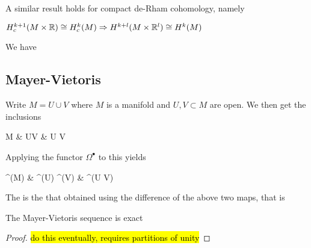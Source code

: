 \documentclass{article}
\begin{document}
A similar result holds for compact de-Rham cohomology, namely

\begin{lemma}
	$H^{k+1}_c(M \times \mathbb{R}) \cong H^k_c(M) \Rightarrow H^{k+l}(M \times \mathbb{R}^l) \cong H^k(M)$
\end{lemma}

\begin{corollary}
	We have 
\end{corollary}


\subsection{Mayer-Vietoris}

Write $M = U \cup V$ where $M$ is a manifold and $U,V \subset M$ are open. We then get the inclusions 
\begin{tkz}
	M & U\coprod V \arrow[l,hook] & U \cap V  
\end{tkz}
Applying the functor $\Omega^\bullet$ to this yields
\begin{tkz}
	\Omega^\bullet(M) \arrow[r] & \Omega^\bullet(U) \oplus \Omega^\bullet(V)   & \Omega^\bullet(U \cap V) 
\end{tkz}

\begin{definition}
	The  is the that obtained using the difference of the above two maps, that is 
\end{definition}

\begin{prop}
The Mayer-Vietoris sequence is exact	
\end{prop}
\begin{proof}
	\hl{do this eventually, requires partitions of unity}
\end{proof}
\end{document}
